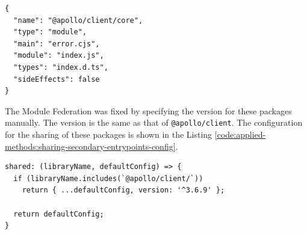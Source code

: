 \ifshowListings
\begin{listing}[H]
  \begin{verbatim}
{
  "name": "@apollo/client/core",
  "type": "module",
  "main": "error.cjs",
  "module": "index.js",
  "types": "index.d.ts",
  "sideEffects": false
}
  \end{verbatim}
  \caption{The \texttt{package.json} of \texttt{@apollo/client/core}.}\label{code:applied-methods:package-json-apollo-client-core}
\end{listing}
\fi

\noindent The Module Federation was fixed by specifying the version for these packages manually. The version is the same as that of \texttt{@apollo/client}. The configuration for the sharing of these packages is shown in the Listing \ref{code:applied-methods:sharing-secondary-entrypoints-config}. 

\ifshowListings
\begin{listing}[H]
  \begin{verbatim}
shared: (libraryName, defaultConfig) => {
  if (libraryName.includes(`@apollo/client/`))
    return { ...defaultConfig, version: '^3.6.9' };

  return defaultConfig;
}
  \end{verbatim}
  \caption{Specify the version for the secondary entry points for the \texttt{@apollo/client} package.}\label{code:applied-methods:sharing-secondary-entrypoints-config}
\end{listing}
\fi
